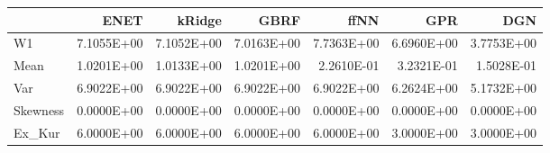 \begin{tabular}{lrrrrrr}
\toprule
{} &       ENET &     kRidge &       GBRF &       ffNN &        GPR &        DGN \\
\midrule
W1       & 7.1055E+00 & 7.1052E+00 & 7.0163E+00 & 7.7363E+00 & 6.6960E+00 & 3.7753E+00 \\
Mean     & 1.0201E+00 & 1.0133E+00 & 1.0201E+00 & 2.2610E-01 & 3.2321E-01 & 1.5028E-01 \\
Var      & 6.9022E+00 & 6.9022E+00 & 6.9022E+00 & 6.9022E+00 & 6.2624E+00 & 5.1732E+00 \\
Skewness & 0.0000E+00 & 0.0000E+00 & 0.0000E+00 & 0.0000E+00 & 0.0000E+00 & 0.0000E+00 \\
Ex\_Kur   & 6.0000E+00 & 6.0000E+00 & 6.0000E+00 & 6.0000E+00 & 3.0000E+00 & 3.0000E+00 \\
\bottomrule
\end{tabular}
